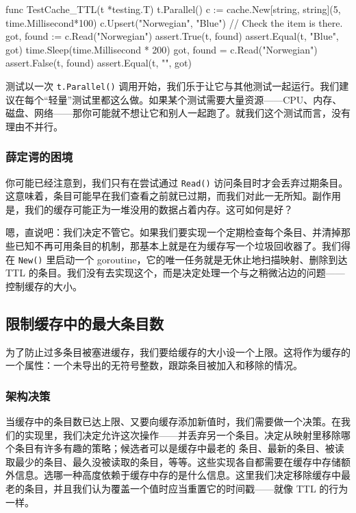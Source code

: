 \begin{gocode}[title={代码清单 7.15 \texttt{cache\_test.go}：测试带 TTL 的 \texttt{Read}}]
func TestCache_TTL(t *testing.T) {
    t.Parallel()
    c := cache.New[string, string](5, time.Millisecond*100)
    c.Upsert("Norwegian", "Blue")
    // Check the item is there.
    got, found := c.Read("Norwegian")
    assert.True(t, found)
    assert.Equal(t, "Blue", got)
    time.Sleep(time.Millisecond * 200)
    got, found = c.Read("Norwegian")
    assert.False(t, found)
    assert.Equal(t, "", got)
}
\end{gocode}

测试以一次 \texttt{t.Parallel()} 调用开始，我们乐于让它与其他测试一起运行。我们建议在每个``轻量''测试里都这么做。如果某个测试需要大量资源——CPU、内存、磁盘、网络——那你可能就不想让它和别人一起跑了。就我们这个测试而言，没有理由不并行。

\subsubsection*{薛定谔的困境}

你可能已经注意到，我们只有在尝试通过 \texttt{Read()} 访问条目时才会丢弃过期条目。这意味着，条目可能早在我们查看之前就已过期，而我们对此一无所知。副作用是，我们的缓存可能正为一堆没用的数据占着内存。这可如何是好？

嗯，直说吧：我们决定不管它。如果我们要实现一个定期检查每个条目、并清掉那些已知不再可用条目的机制，那基本上就是在为缓存写一个垃圾回收器了。我们得在 \texttt{New()} 里启动一个 goroutine，它的唯一任务就是无休止地扫描映射、删除到达 TTL 的条目。我们没有去实现这个，而是决定处理一个与之稍微沾边的问题——控制缓存的大小。

\subsection{限制缓存中的最大条目数}

为了防止过多条目被塞进缓存，我们要给缓存的大小设一个上限。这将作为缓存的一个属性：一个未导出的无符号整数，跟踪条目被加入和移除的情况。

\subsubsection*{架构决策}

当缓存中的条目数已达上限、又要向缓存添加新值时，我们需要做一个决策。在我们的实现里，我们决定允许这次操作——并丢弃另一个条目。决定从映射里移除哪个条目有许多有趣的策略；候选者可以是缓存中最老的
条目、最新的条目、被读取最少的条目、最久没被读取的条目，等等。这些实现各自都需要在缓存中存储额外信息。选哪一种高度依赖于缓存中存的是什么信息。这里我们决定移除缓存中最老的条目，并且我们认为覆盖一个值时应当重置它的时间戳——就像 TTL 的行为一样。

